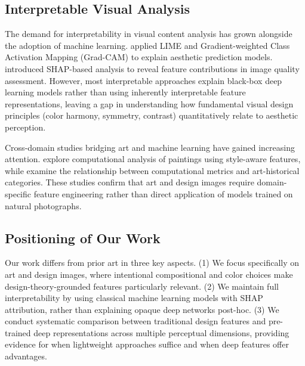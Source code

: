 \subsection{Interpretable Visual Analysis}
\label{sec:rw_interpretable}

The demand for interpretability in visual content analysis has grown alongside the adoption of machine learning. \citet{wang2021towards} applied LIME and Gradient-weighted Class Activation Mapping (Grad-CAM) to explain aesthetic prediction models. \citet{li2023interpretable} introduced SHAP-based analysis to reveal feature contributions in image quality assessment. However, most interpretable approaches explain black-box deep learning models rather than using inherently interpretable feature representations, leaving a gap in understanding how fundamental visual design principles (color harmony, symmetry, contrast) quantitatively relate to aesthetic perception.

Cross-domain studies bridging art and machine learning have gained increasing attention. \citet{eltem2023art} explore computational analysis of paintings using style-aware features, while \citet{castellano2022computational} examine the relationship between computational metrics and art-historical categories. These studies confirm that art and design images require domain-specific feature engineering rather than direct application of models trained on natural photographs.

\subsection{Positioning of Our Work}
\label{sec:rw_positioning}

Our work differs from prior art in three key aspects. (1) We focus specifically on art and design images, where intentional compositional and color choices make design-theory-grounded features particularly relevant. (2) We maintain full interpretability by using classical machine learning models with SHAP attribution, rather than explaining opaque deep networks post-hoc. (3) We conduct systematic comparison between traditional design features and pre-trained deep representations across multiple perceptual dimensions, providing evidence for when lightweight approaches suffice and when deep features offer advantages.
